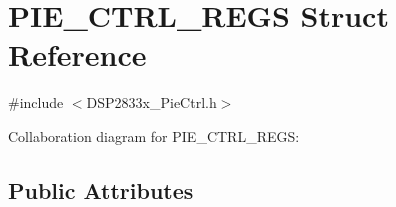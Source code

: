 \hypertarget{struct_p_i_e___c_t_r_l___r_e_g_s}{}\section{P\+I\+E\+\_\+\+C\+T\+R\+L\+\_\+\+R\+E\+G\+S Struct Reference}
\label{struct_p_i_e___c_t_r_l___r_e_g_s}


{\ttfamily \#include $<$D\+S\+P2833x\+\_\+\+Pie\+Ctrl.\+h$>$}



Collaboration diagram for P\+I\+E\+\_\+\+C\+T\+R\+L\+\_\+\+R\+E\+G\+S\+:
\subsection*{Public Attributes}

